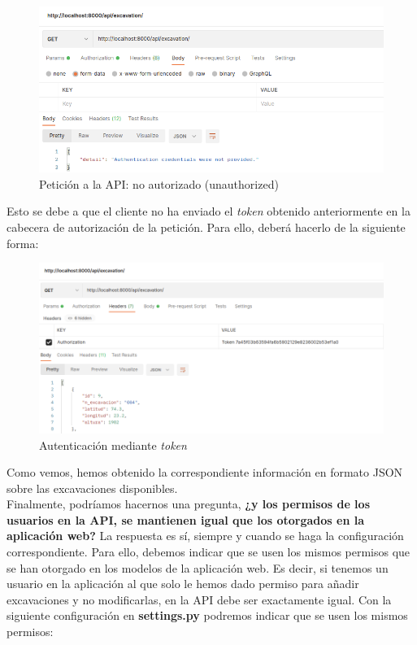     \begin{figure}[H]
        \centering
        \includegraphics[scale=0.45]{imagenes/unauthorized2.png}
        \caption{Petición a la API: no autorizado (unauthorized)}
        \label{fig:unauthorized2}
    \end{figure}

Esto se debe a que el cliente no ha enviado el \textit{token} obtenido anteriormente en la
cabecera de autorización de la petición. Para ello, deberá hacerlo de la siguiente
forma:

    \begin{figure}[H]
        \centering
        \includegraphics[scale=0.38]{imagenes/token-auth.png}
        \caption{Autenticación mediante \textit{token}}
        \label{fig:token-auth}
    \end{figure}

Como vemos, hemos obtenido la correspondiente información en formato JSON sobre las
excavaciones disponibles.\\

Finalmente, podríamos hacernos una pregunta, \textbf{¿y los permisos de los usuarios en la
API, se mantienen igual que los otorgados en la aplicación web?} La respuesta es sí, siempre
y cuando se haga la configuración correspondiente. Para ello, debemos indicar que se usen
los mismos permisos que se han otorgado en los modelos de la aplicación web. Es decir, si
tenemos un usuario en la aplicación al que solo le hemos dado permiso para añadir excavaciones
y no modificarlas, en la API debe ser exactamente igual. Con la siguiente configuración en
\textbf{settings.py} podremos indicar que se usen los mismos permisos:

